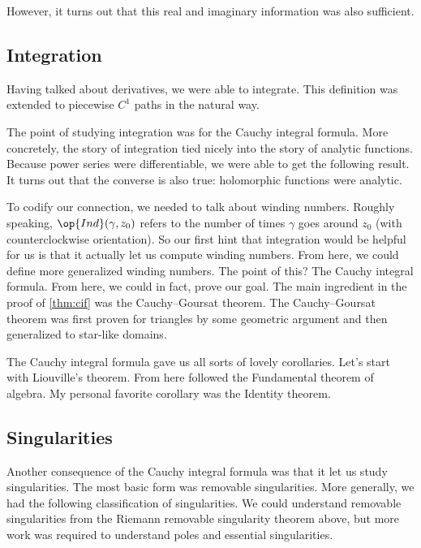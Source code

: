 However, it turns out that this real and imaginary information was also sufficient.
\cauchyriemannsufficient*

\subsection{Integration}
Having talked about derivatives, we were able to integrate.
\integraldefi*
\noindent This definition was extended to piecewise $C^1$ paths in the natural way.

The point of studying integration was for the Cauchy integral formula. More concretely, the story of integration tied nicely into the story of analytic functions.
\analyticdefi*
\noindent Because power series were differentiable, we were able to get the following result.
\analyticishololem*
\noindent It turns out that the converse is also true: holomorphic functions were analytic.

To codify our connection, we needed to talk about winding numbers. Roughly speaking, $\op{Ind}(\gamma,z_0)$ refers to the number of times $\gamma$ goes around $z_0$ (with counterclockwise orientation). So our first hint that integration would be helpful for us is that it actually let us compute winding numbers.
\windingnumberformulalem*
\noindent From here, we could define more generalized winding numbers.
\indexdefi*
\noindent The point of this? The Cauchy integral formula.
\thmcif*
\noindent From here, we could in fact, prove our goal.
\holoisanacor*
\noindent The main ingredient in the proof of \autoref{thm:cif} was the Cauchy--Goursat theorem.
\starlikecg*
\noindent The Cauchy--Goursat theorem was first proven for triangles by some geometric argument and then generalized to star-like domains.

The Cauchy integral formula gave us all sorts of lovely corollaries. Let's start with Liouville's theorem.
\liovillethm*
\noindent From here followed the Fundamental theorem of algebra.
\ftathm*
\noindent My personal favorite corollary was the Identity theorem.
\identitythm*

\subsection{Singularities}
Another consequence of the Cauchy integral formula was that it let us study singularities. The most basic form was removable singularities.
\removablethm*
\noindent More generally, we had the following classification of singularities.
\basicsingularitydefi*
\isosingularitydefi*
\noindent We could understand removable singularities from the Riemann removable singularity theorem above, but more work was required to understand poles and essential singularities.

